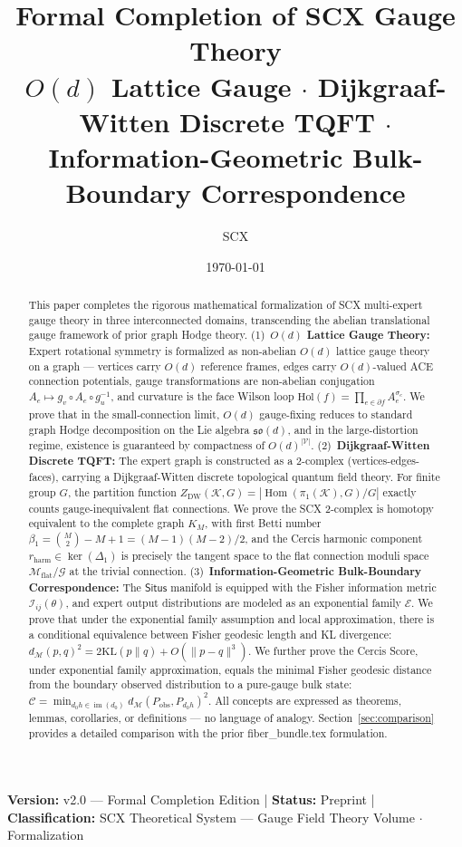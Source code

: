 \documentclass[12pt,a4paper]{article}
\title{
    {\Huge \textbf{Formal Completion of SCX Gauge Theory}}\\[0.5em]
    {\Large $O(d)$ Lattice Gauge $\cdot$ Dijkgraaf-Witten Discrete TQFT $\cdot$ Information-Geometric Bulk-Boundary Correspondence}
}
\author{SCX}
\date{\today}
\theoremstyle{definition}
\theoremstyle{remark}
\theoremstyle{definition}
\newcommand{\verts}{\mathcal{V}}
\newcommand{\face}{\ensuremath{\mathit{f}}}
\newcommand{\Lone}{\Delta_1}
\newcommand{\Hol}{\mathrm{Hol}}
\newcommand{\cercis}{\mathcal{C}}
\newcommand{\Situs}{\textsf{Situs}}
\newcommand{\Fisher}{\mathcal{I}}
\newcommand{\KL}{\mathrm{KL}}
\newcommand{\ExpFam}{\mathcal{E}}
\newcommand{\GeoDist}{d_{\mathcal{M}}}
\newcommand{\DW}{\mathrm{DW}}
\newcommand{\ZBetti}{\beta_1}
\newcommand{\Gflatquot}{\mathcal{M}_{\mathrm{flat}}/\mathcal{G}}
\DeclareMathOperator{\im}{im}
\DeclareMathOperator{\Hom}{Hom}
\begin{document}
\maketitle

\begin{center}
\footnotesize
\textbf{Version:} v2.0 — Formal Completion Edition \quad | \quad
\textbf{Status:} Preprint \quad | \quad
\textbf{Classification:} SCX Theoretical System — Gauge Field Theory Volume $\cdot$ Formalization
\end{center}

\begin{abstract}

\noindent
This paper completes the rigorous mathematical formalization of SCX multi-expert gauge theory in three interconnected domains,
transcending the abelian translational gauge framework of prior graph Hodge theory.
(1)~\textbf{$O(d)$ Lattice Gauge Theory:} Expert rotational symmetry is formalized as non-abelian $O(d)$ lattice gauge theory on a graph —
vertices carry $O(d)$ reference frames, edges carry $O(d)$-valued ACE connection potentials,
gauge transformations are non-abelian conjugation $A_e \mapsto g_v \circ A_e \circ g_u^{-1}$,
and curvature is the face Wilson loop $\Hol(\face) = \prod_{e \in \partial \face} A_e^{\sigma_e}$.
We prove that in the small-connection limit, $O(d)$ gauge-fixing reduces to standard graph Hodge decomposition on the Lie algebra $\mathfrak{so}(d)$,
and in the large-distortion regime, existence is guaranteed by compactness of $O(d)^{|\verts|}$.
(2)~\textbf{Dijkgraaf-Witten Discrete TQFT:} The expert graph is constructed as a 2-complex (vertices-edges-faces),
carrying a Dijkgraaf-Witten discrete topological quantum field theory. For finite group $G$, the partition function
$Z_{\DW}(\mathcal{K}, G) = |\Hom(\pi_1(\mathcal{K}), G)/G|$ exactly counts gauge-inequivalent flat connections.
We prove the SCX 2-complex is homotopy equivalent to the complete graph $K_M$, with first Betti number
$\ZBetti = \binom{M}{2} - M + 1 = (M-1)(M-2)/2$,
and the Cercis harmonic component $r_{\text{harm}} \in \ker(\Lone)$ is precisely the tangent space to the flat connection moduli space $\Gflatquot$ at the
trivial connection.
(3)~\textbf{Information-Geometric Bulk-Boundary Correspondence:} The $\Situs$ manifold is equipped with the Fisher information metric $\Fisher_{ij}(\theta)$,
and expert output distributions are modeled as an exponential family $\ExpFam$. We prove that under the exponential family assumption and local approximation, there is a conditional equivalence between Fisher geodesic length and KL divergence:
$\GeoDist(p,q)^2 = 2\KL(p\|q) + O(\|p-q\|^3)$.
We further prove the Cercis Score, under exponential family approximation, equals the minimal Fisher geodesic distance
from the boundary observed distribution to a pure-gauge bulk state: $\cercis = \min_{d_0 h \in \im(d_0)} \GeoDist(P_{\text{obs}}, P_{d_0 h})^2$.
All concepts are expressed as theorems, lemmas, corollaries, or definitions — no language of analogy.
Section~\ref{sec:comparison} provides a detailed comparison with the prior fiber\_bundle.tex formulation.


\end{abstract}
\end{document}
